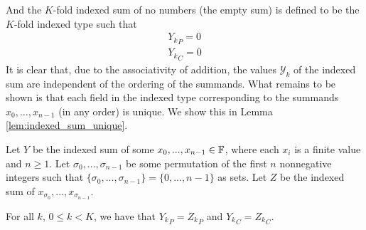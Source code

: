       And the $K$-fold indexed sum of no numbers (the empty sum) is defined to be the $K$-fold indexed type such that
      \begin{align}
        {Y_k}_P = 0\nonumber\\
        {Y_k}_C = 0
        \label{eq:indexed_sum_zero}
      \end{align}
      It is clear that, due to the associativity of addition, the values $\mathcal{Y}_k$ of the indexed sum are independent of the ordering of the summands. What remains to be shown is that each field in the indexed type corresponding to the summands $x_0, ..., x_{n - 1}$ (in any order) is unique. We show this in Lemma \ref{lem:indexed_sum_unique}.

      \begin{samepage}
      \begin{lem}
        Let $Y$ be the indexed sum of some $x_0, ..., x_{n - 1} \in \mathbb{F}$, where each $x_i$ is a finite value and $n \geq 1$.
        Let $\sigma_0, ..., \sigma_{n - 1}$ be some permutation of the first $n$ nonnegative integers such that $\{\sigma_0, ..., \sigma_{n - 1}\} = \{0, ..., n - 1\}$ as sets.
        Let $Z$ be the indexed sum of $x_{\sigma_0}, ..., x_{\sigma_{n - 1}}$.

        For all $k$, $0 \leq k < K$, we have that ${Y_k}_P = {Z_k}_P$ and ${Y_k}_C = {Z_k}_C$.
        \label{lem:indexed_sum_unique}
      \end{lem}
      \end{samepage}

